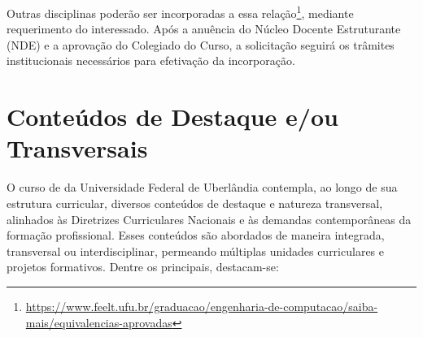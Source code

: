 

Outras disciplinas poderão ser incorporadas a essa relação\footnote{\url{https://www.feelt.ufu.br/graduacao/engenharia-de-computacao/saiba-mais/equivalencias-aprovadas}}, mediante requerimento do interessado. Após a anuência do Núcleo Docente Estruturante (NDE) e a aprovação do Colegiado do Curso, a solicitação seguirá os trâmites institucionais necessários para efetivação da incorporação.

\section{Conteúdos de Destaque e/ou Transversais}

O curso de \nomecursonovo da Universidade Federal de Uberlândia contempla, ao longo de sua estrutura curricular, diversos conteúdos de destaque e natureza transversal, alinhados às Diretrizes Curriculares Nacionais e às demandas contemporâneas da formação profissional. Esses conteúdos são abordados de maneira integrada, transversal ou interdisciplinar, permeando múltiplas unidades curriculares e projetos formativos. Dentre os principais, destacam-se:

